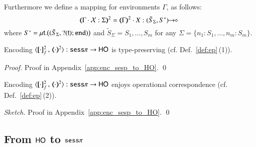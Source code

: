 \begin{remark}\rm
	Furthermore we define a mapping for environments $\Gamma$, as follows:
	\[
		\tmap{\Gamma \cat \rvar{X}:\Sigma}{2} = \tmap{\Gamma}{2} \cat X:\shot{(\tilde{S}_{\Sigma}, S^*)}
	\]
	where
	$S^* = \mu\mathsf{t}.\big((\tilde{S}_{\Sigma}, ? (\mathsf{t}) ;\mathtt{end})\big)$
	and
	$\tilde{S}_{\Sigma} = S_1, \ldots, S_m$ for any $\Sigma = \{n_1:S_1, \ldots, n_m:S_m\}$.
\end{remark}

\begin{proposition}\rm
	Encoding $\fencod{\cdot}{\cdot}{2}{f}: \sesp \to \HO$  
	is type-preserving (cf. Def.~\ref{def:ep}\,(1)).
\end{proposition}

\begin{proof}
	Proof in Appendix~\ref{app:enc_sesp_to_HO}.
	\qed
\end{proof}

\begin{proposition}\rm
	Encoding $\fencod{\cdot}{\cdot}{2}{f}: \sesp \to \HO$ 
	enjoys operational correspondence (cf. Def.~\ref{def:ep}\,(2)).
\end{proposition}

\begin{proof}[Sketch]
	Proof in Appendix~\ref{app:enc_sesp_to_HO}.
	\qed
\end{proof}

\subsection{From $\mathsf{HO}$ to $\mathtt{sess}\pi$}

